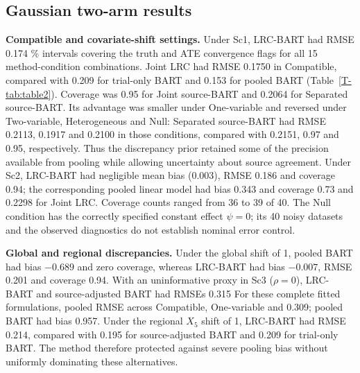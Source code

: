 \documentclass[11pt]{article}
\newcommand{\lrc}{LRC-BART} %
\theoremstyle{remark}\newtheorem{remark}{Remark}[section]
\providecommand{\DIFaddtex}[1]{{\protect\color{blue} \sf #1}} %
\providecommand{\DIFdeltex}[1]{{\protect\color{red} \scriptsize #1}} %
\providecommand{\DIFaddbegin}{} %
\providecommand{\DIFaddend}{} %
\providecommand{\DIFdelbegin}{} %
\providecommand{\DIFdelend}{} %
\providecommand{\DIFadd}[1]{\texorpdfstring{\DIFaddtex{#1}}{#1}} %
\providecommand{\DIFdel}[1]{\texorpdfstring{\DIFdeltex{#1}}{}} %
\begin{document}
\subsection{\DIFdel{Gaussian two-arm results}}
\addtocounter{subsection}{-1}%
\DIFdel{\textbf{Compatible and covariate-shift settings.}
Under Sc1, \lrc{} had RMSE 0.174}\DIFdelend \DIFaddbegin \DIFadd{\% intervals covering the truth and ATE convergence flags for all 15 method-condition combinations. Joint LRC had RMSE 0.1750 in Compatible}\DIFaddend , compared with \DIFdelbegin \DIFdel{0.209 for trial-only BART and 0.153 for pooled BART (Table~\ref{T-tab:table2}). Coverage was 0.95}\DIFdelend \DIFaddbegin \DIFadd{0.2133 for Joint source-BART and 0.2064 for Separated source-BART. Its advantage was smaller under One-variable and reversed under Two-variable, Heterogeneous and Null: Separated source-BART had RMSE 0.2113, 0.1917 and 0.2100 in those conditions, compared with 0.2151}\DIFaddend , \DIFdelbegin \DIFdel{0.97 and 0.95, respectively. Thus the discrepancy prior retained some of the precision available from pooling while allowing uncertainty about source agreement. Under Sc2, \lrc{} had negligible mean bias (0.003), RMSE 0.186 and coverage 0.94; the corresponding pooled linear model had bias 0.343 and coverage 0.73}\DIFdelend \DIFaddbegin \DIFadd{0.2092 and 0.2298 for Joint LRC. Coverage counts ranged from 36 to 39 of 40. The Null condition has the correctly specified constant effect $\psi=0$; its 40 noisy datasets and the observed diagnostics do not establish nominal error control}\DIFaddend .

\DIFdelbegin %
\DIFdel{\textbf{Global and regional discrepancies.}
Under the global shift of 1, pooled BART had bias $-0.689$ and zero coverage, whereas \lrc{} had bias $-0.007$, RMSE 0.201 and coverage 0.94. With an uninformative proxy in Sc3 ($\rho=0$), \lrc{} and source-adjusted BART had RMSEs 0.315 }\DIFdelend \DIFaddbegin \DIFadd{For these complete fitted formulations, pooled RMSE across Compatible, One-variable }\DIFaddend and \DIFdelbegin \DIFdel{0.309; pooled BART had bias 0.957. Under the regional $X_5$ shift of 1, \lrc{} had RMSE 0.214, compared with 0.195 for source-adjusted BART and 0.209 for trial-only BART. The method therefore protected against severe pooling bias without uniformly dominating these alternatives.
}%

\end{document}
